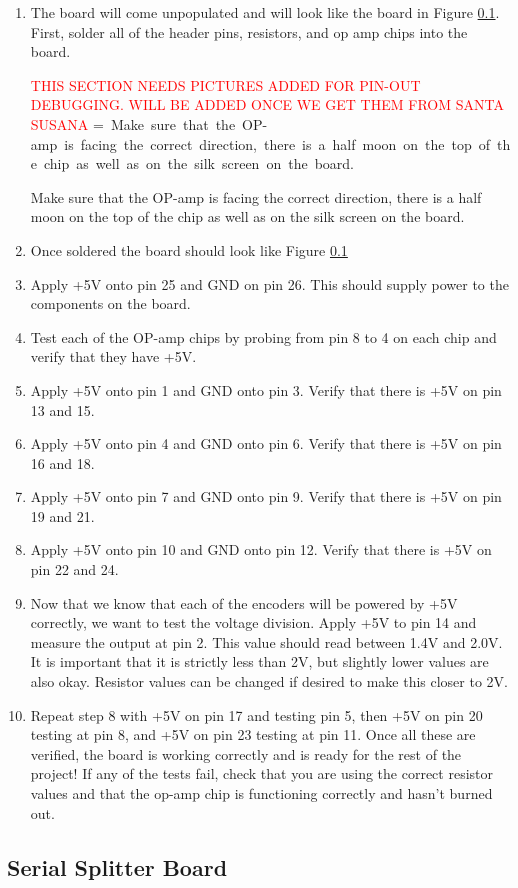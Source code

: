 \documentclass[12pt]{article}
\makeatletter
\newcommand{\mybox}[1]{%
  \setbox0=\hbox{#1}%
  \setlength{\@tempdima}{\dimexpr\wd0+13pt}%
  \begin{tcolorbox}[colframe=mycolor,boxrule=0.5pt,arc=4pt,
      left=6pt,right=6pt,top=6pt,bottom=6pt,boxsep=0pt,width=0.95\textwidth]
    #1
  \end{tcolorbox}
}
\makeatother
\begin{document}
\begin{enumerate}
	\item The board will come unpopulated and will look like the board in Figure \ref{}. First, solder all of the header pins, resistors, and op amp chips into the board. 

\textcolor{red}{THIS SECTION NEEDS PICTURES ADDED FOR PIN-OUT DEBUGGING. WILL BE ADDED ONCE WE GET THEM FROM SANTA SUSANA}
\mybox{
Make sure that the OP-amp is facing the correct direction, there is a half moon on the top of the chip as well as on the silk screen on the board. 
}
	\item Once soldered the board should look like Figure \ref{}
	\item Apply +5V onto pin 25 and GND on pin 26. This should supply power to the components on the board.
	\item Test each of the OP-amp chips by probing from pin 8 to 4 on each chip and verify that they have +5V.
	\item Apply +5V onto pin 1 and GND onto pin 3. Verify that there is +5V on pin 13 and 15.
	\item Apply +5V onto pin 4 and GND onto pin 6. Verify that there is +5V on pin 16 and 18.
	\item Apply +5V onto pin 7 and GND onto pin 9. Verify that there is +5V on pin 19 and 21.
	\item Apply +5V onto pin 10 and GND onto pin 12. Verify that there is +5V on pin 22 and 24.
	\item Now that we know that each of the encoders will be powered by +5V correctly, we want to test the voltage division. Apply +5V to pin 14 and measure the output at pin 2. This value should read between 1.4V and 2.0V. It is important that it is strictly less than 2V, but slightly lower values are also okay. Resistor values can be changed if desired to make this closer to 2V. 
	\item Repeat step 8 with +5V on pin 17 and testing pin 5, then +5V on pin 20 testing at pin 8, and +5V on pin 23 testing at pin 11. Once all these are verified, the board is working correctly and is ready for the rest of the project! If any of the tests fail, check that you are using the correct resistor values and that the op-amp chip is functioning correctly and hasn't burned out.  
\end{enumerate}

\subsection{Serial Splitter Board}
\end{document}
